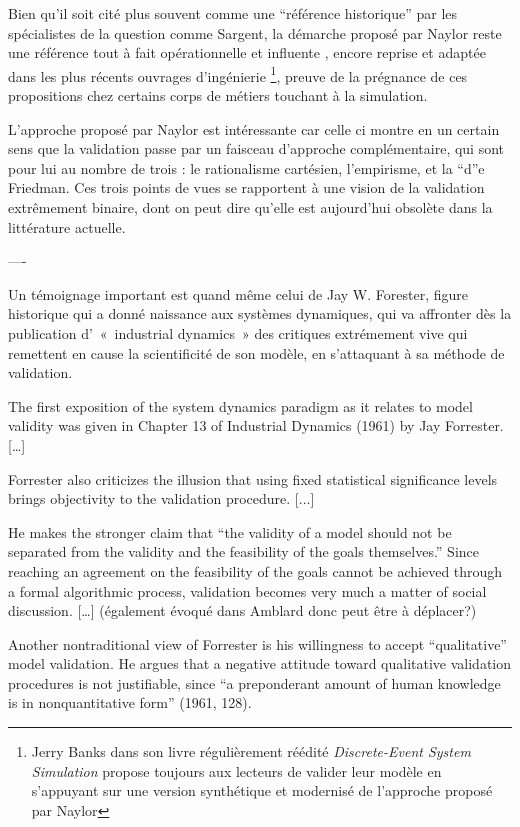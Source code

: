 Bien qu'il soit cité plus souvent comme une \enquote{référence historique} par les spécialistes de la question comme Sargent, la démarche proposé par Naylor reste une référence tout à fait opérationnelle et influente \autocite{Nance2002}, encore reprise et adaptée dans les plus récents ouvrages d’ingénierie \footnote{Jerry Banks dans son livre régulièrement réédité \textit{Discrete-Event System Simulation} propose toujours aux lecteurs de valider leur modèle en s'appuyant sur une version synthétique et modernisé de l'approche proposé par Naylor}, preuve de la prégnance de ces propositions chez certains corps de métiers touchant à la simulation.

L'approche proposé par Naylor est intéressante car celle ci montre en un certain sens que la validation passe par un faisceau d'approche complémentaire, qui sont pour lui au nombre de trois : le rationalisme cartésien, l'empirisme, et la \foreignquote{positive economics} de Friedman. Ces trois points de vues se rapportent à une vision de la validation extrêmement binaire, dont on peut dire qu'elle est aujourd'hui obsolète dans la littérature actuelle.

----

Un témoignage important est quand même celui de Jay W. Forester, figure historique qui a donné naissance aux systèmes dynamiques, qui va affronter dès la publication d' « industrial dynamics » des critiques extrémement vive qui remettent en cause la scientificité de son modèle, en s'attaquant à sa méthode de validation.

The first exposition of the system dynamics paradigm as it relates to model validity
was given in Chapter 13 of Industrial Dynamics (1961) by Jay Forrester. […] 

Forrester also criticizes the illusion that using fixed statistical significance levels brings objectivity to the validation procedure. [...]

He makes the stronger claim that “the validity of a model should not be separated from the validity and the feasibility of the goals themselves.” Since reaching an agreement on the feasibility of the goals cannot be achieved through a formal algorithmic process, validation becomes very much a matter of social discussion. […] (également évoqué dans Amblard donc peut être à déplacer?)

Another nontraditional view of Forrester is his willingness to accept “qualitative” model validation. He argues that a negative attitude toward qualitative validation procedures is not justifiable, since “a preponderant amount of human knowledge is in nonquantitative form” (1961, 128). 

